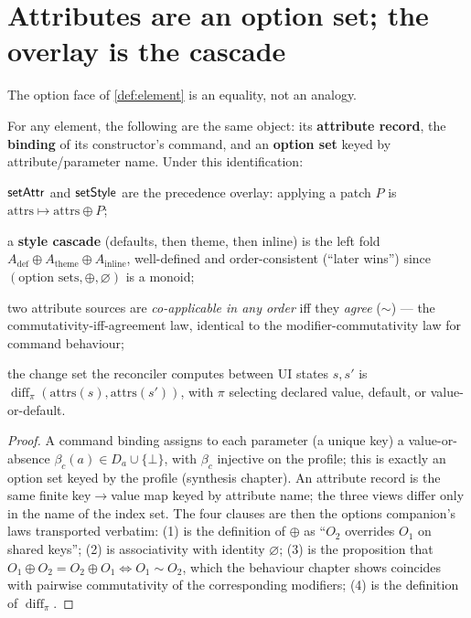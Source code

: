 \documentclass[../uxoxo-main]{subfiles}
\begin{document}
\section{Attributes are an option set; the overlay is the cascade}\label{sec:attrs}
The option face of \cref{def:element} is an equality, not an analogy.

\begin{theorem}\label{thm:attrs}
For any element, the following are the same object: its \textbf{attribute record},
the \textbf{binding} of its constructor's command, and an \textbf{option set} keyed
by attribute/parameter name. Under this identification:
\begin{definitionlist}
  \item $\mathsf{setAttr}$ and $\mathsf{setStyle}$ are the precedence overlay: applying a patch
        $P$ is $\mathrm{attrs}\mapsto \mathrm{attrs}\oplus P$;
  \item a \textbf{style cascade} (defaults, then theme, then inline) is the left
        fold $A_{\mathrm{def}}\oplus A_{\mathrm{theme}}\oplus A_{\mathrm{inline}}$,
        well-defined and order-consistent (``later wins'') since
        $(\text{option sets},\oplus,\varnothing)$ is a monoid;
  \item two attribute sources are \emph{co-applicable in any order} iff they
        \emph{agree} ($\sim$) --- the commutativity-iff-agreement law, identical to
        the modifier-commutativity law for command behaviour;
  \item the change set the reconciler computes between UI states $s,s'$ is
        $\operatorname{diff}_\pi(\mathrm{attrs}(s),\mathrm{attrs}(s'))$, with $\pi$
        selecting declared value, default, or value-or-default.
\end{definitionlist}
\end{theorem}

\begin{proof}
A command binding assigns to each parameter (a unique key) a value-or-absence
$\beta_c(a)\in D_a\cup\{\bot\}$, with $\beta_c$ injective on the profile; this is
exactly an option set keyed by the profile (synthesis chapter). An attribute record
is the same finite key$\to$value map keyed by attribute name; the three views differ
only in the name of the index set. The four clauses are then the options companion's
laws transported verbatim: (1) is the definition of $\oplus$ as ``$O_2$ overrides
$O_1$ on shared keys''; (2) is associativity with identity $\varnothing$; (3) is the
proposition that $O_1\oplus O_2=O_2\oplus O_1\iff O_1\sim O_2$, which the behaviour
chapter shows coincides with pairwise commutativity of the corresponding modifiers;
(4) is the definition of $\operatorname{diff}_\pi$.
\end{proof}
\end{document}
